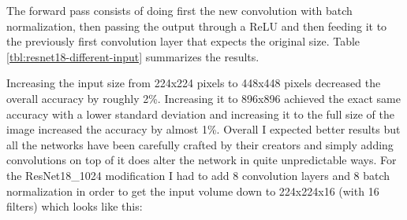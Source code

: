 The forward pass consists of doing first the new convolution with batch normalization, then passing the output through a ReLU and then feeding it to the previously first convolution layer that expects the original size. Table \ref{tbl:resnet18-different-input} summarizes the results.

\begin{table}[!h] \centering
{}
\caption{Different image input sizes are fed into ResNet18 architectuers with only 16 filters per layer. The first layers of the network have been adapted to allow bigger input images}
\label{tbl:resnet18-different-input}
\end{table}

Increasing the input size from 224x224 pixels to 448x448 pixels decreased the overall accuracy by roughly 2\%. Increasing it to 896x896 achieved the exact same accuracy with a lower standard deviation and increasing it to the full size of the image increased the accuracy by almost 1\%. Overall I expected better results but all the networks have been carefully crafted by their creators and simply adding convolutions on top of it does alter the network in quite unpredictable ways. For the ResNet18\_1024 modification I had to add 8 convolution layers and 8 batch normalization in order to get the input volume down to 224x224x16 (with 16 filters) which looks like this:

